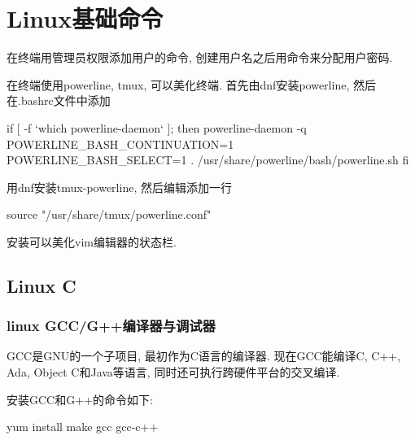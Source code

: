 \chapter{Linux基础命令}


在终端用管理员权限添加用户的命令, 
创建用户名之后用命令来分配用户密码.

在终端使用powerline, tmux, 可以美化终端. 首先由dnf安装powerline, 
然后在.bashrc文件中添加
\begin{shell}
if [ -f `which powerline-daemon` ]; then
  powerline-daemon -q
  POWERLINE_BASH_CONTINUATION=1
  POWERLINE_BASH_SELECT=1
  . /usr/share/powerline/bash/powerline.sh
fi
\end{shell}
用dnf安装tmux-powerline, 然后编辑添加一行
\begin{shell}
 source "/usr/share/tmux/powerline.conf"
\end{shell}

安装可以美化vim编辑器的状态栏.

\section{Linux C}


\subsection{linux GCC/G++编译器与调试器}
GCC是GNU的一个子项目, 最初作为C语言的编译器. 现在GCC能编译C, 
C++, Ada, Object C和Java等语言, 同时还可执行跨硬件平台的交叉编译.

安装GCC和G++的命令如下:
\begin{shell}
 yum install make gcc gcc-c++
\end{shell}

